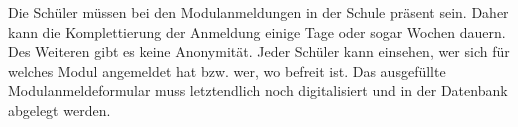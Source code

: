 Die Schüler müssen bei den Modulanmeldungen in der Schule präsent sein. 
Daher kann die Komplettierung der Anmeldung einige Tage oder sogar Wochen dauern. 
Des Weiteren gibt es keine Anonymität. Jeder Schüler kann einsehen, wer sich für welches Modul angemeldet hat bzw. wer, wo befreit ist. 
Das ausgefüllte Modulanmeldeformular muss letztendlich noch digitalisiert und in der Datenbank abgelegt werden.